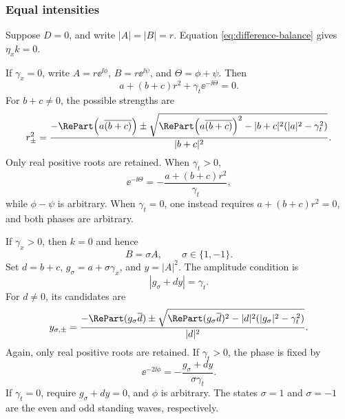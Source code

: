 \subsubsection{Equal intensities}

Suppose $D=0$, and write $|A|=|B|=r$.  Equation
\eqref{eq:difference-balance} gives $\eta_xk=0$.

If $\gamma_x=0$, write $A=r\ee^{\ii\phi}$,
$B=r\ee^{\ii\psi}$, and $\Theta=\phi+\psi$.  Then
\begin{equation}
 a+(b+c)r^2+\gamma_t\ee^{-\ii\Theta}=0.
 \label{eq:equal-temporal-balance}
\end{equation}
For $b+c\neq0$, the possible strengths are
\begin{equation}
 r_\pm^2=
 \frac{-\RePart\!\left(a\overline{(b+c)}\right)
 \pm\sqrt{
 \RePart\!\left(a\overline{(b+c)}\right)^2
 -|b+c|^2(|a|^2-\gamma_t^2)}}{|b+c|^2}.
 \label{eq:equal-temporal-strength}
\end{equation}
Only real positive roots are retained.  When $\gamma_t>0$,
\begin{equation}
 \ee^{-\ii\Theta}=-\frac{a+(b+c)r^2}{\gamma_t},
 \label{eq:equal-temporal-phase}
\end{equation}
while $\phi-\psi$ is arbitrary.  When $\gamma_t=0$, one instead requires
$a+(b+c)r^2=0$, and both phases are arbitrary.

If $\gamma_x>0$, then $k=0$ and hence
\begin{equation}
 B=\sigma A,
 \qquad \sigma\in\{1,-1\}.
 \label{eq:equal-parity}
\end{equation}
Set $d=b+c$, $g_\sigma=a+\sigma\gamma_x$, and $y=|A|^2$.  The amplitude
condition is
\begin{equation}
 |g_\sigma+dy|=\gamma_t.
 \label{eq:equal-parity-balance}
\end{equation}
For $d\neq0$, its candidates are
\begin{equation}
 y_{\sigma,\pm}=
 \frac{-\RePart(g_\sigma\overline d)
 \pm\sqrt{\RePart(g_\sigma\overline d)^2
 -|d|^2(|g_\sigma|^2-\gamma_t^2)}}{|d|^2}.
 \label{eq:equal-parity-strength}
\end{equation}
Again, only real positive roots are retained.  If $\gamma_t>0$, the phase
is fixed by
\begin{equation}
 \ee^{-2\ii\phi}=-\frac{g_\sigma+dy}{\sigma\gamma_t}.
 \label{eq:equal-parity-phase}
\end{equation}
If $\gamma_t=0$, require $g_\sigma+dy=0$, and $\phi$ is arbitrary.  The
states $\sigma=1$ and $\sigma=-1$ are the even and odd standing waves,
respectively.

